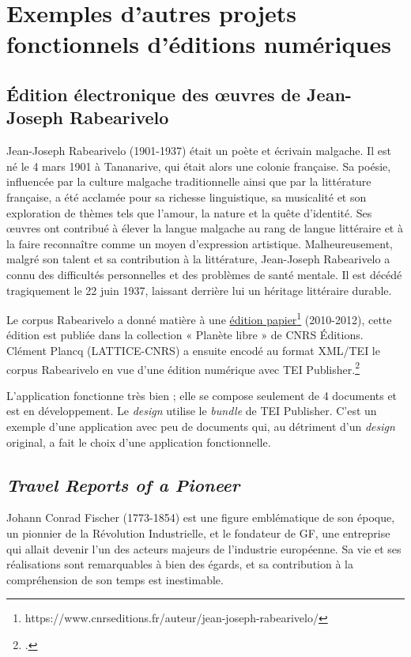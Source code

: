 \section{Exemples d'autres projets fonctionnels d'éditions numériques}

\subsection{Édition électronique des œuvres de Jean-Joseph Rabearivelo}

Jean-Joseph Rabearivelo (1901-1937) était un poète et écrivain malgache. Il est né le 4 mars 1901 à Tananarive, qui était alors une colonie française. Sa poésie, influencée par la culture malgache traditionnelle ainsi que par la littérature française, a été acclamée pour sa richesse linguistique, sa musicalité et son exploration de thèmes tels que l'amour, la nature et la quête d'identité. Ses œuvres ont contribué à élever la langue malgache au rang de langue littéraire et à la faire reconnaître comme un moyen d'expression artistique. Malheureusement, malgré son talent et sa contribution à la littérature, Jean-Joseph Rabearivelo a connu des difficultés personnelles et des problèmes de santé mentale. Il est décédé tragiquement le 22 juin 1937, laissant derrière lui un héritage littéraire durable.

Le corpus Rabearivelo a donné matière à une \href{https://www.cnrseditions.fr/auteur/jean-joseph-rabearivelo/}{édition papier}\footnote{https://www.cnrseditions.fr/auteur/jean-joseph-rabearivelo/} (2010-2012), cette édition est publiée dans la collection « Planète libre » de CNRS Éditions. Clément Plancq (LATTICE-CNRS) a ensuite encodé au format XML/TEI le corpus Rabearivelo en vue d'une édition numérique avec TEI Publisher.\footcite{riffard:halshs-03979331}

L'application fonctionne très bien ; elle se compose seulement de 4 documents et est en développement. Le \textit{design} utilise le \textit{bundle} de TEI Publisher. C'est un exemple d'une application avec peu de documents qui, au détriment d'un \textit{design} original, a fait le choix d'une application fonctionnelle.

\subsection{\textit{Travel Reports of a Pioneer}}

Johann Conrad Fischer (1773-1854) est une figure emblématique de son époque, un pionnier de la Révolution Industrielle, et le fondateur de GF, une entreprise qui allait devenir l'un des acteurs majeurs de l'industrie européenne. Sa vie et ses réalisations sont remarquables à bien des égards, et sa contribution à la compréhension de son temps est inestimable.

